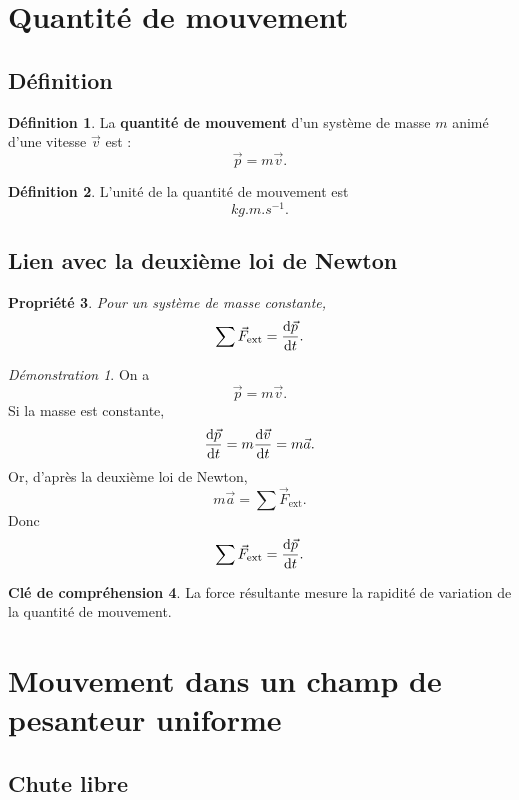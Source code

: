\documentclass[11pt,a4paper]{article}
\theoremstyle{definition}
\newtheorem{definition}{Définition}[section]
\newtheorem{interpretation}[definition]{Clé de compréhension}
\theoremstyle{plain}
\newtheorem{propriete}[definition]{Propriété}
\theoremstyle{remark}
\newtheorem*{demonstrationlibre}{Démonstration}
\begin{document}
\section{Quantité de mouvement}

\subsection{Définition}

\begin{definition}
La \textbf{quantité de mouvement} d'un système de masse $m$ animé d'une vitesse $\vec{v}$ est :
\[
\vec{p}=m\vec{v}.
\]
\end{definition}

\begin{definition}
L'unité de la quantité de mouvement est
\[
\si{kg.m.s^{-1}}.
\]
\end{definition}

\subsection{Lien avec la deuxième loi de Newton}

\begin{propriete}
Pour un système de masse constante,
\[
\sum \vec{F}_{\text{ext}}=\dv{\vec{p}}{t}.
\]
\end{propriete}

\begin{demonstrationlibre}
On a
\[
\vec{p}=m\vec{v}.
\]
Si la masse est constante,
\[
\dv{\vec{p}}{t}=m\dv{\vec{v}}{t}=m\vec{a}.
\]
Or, d'après la deuxième loi de Newton,
\[
m\vec{a}=\sum \vec{F}_{\text{ext}}.
\]
Donc
\[
\sum \vec{F}_{\text{ext}}=\dv{\vec{p}}{t}.
\]
\end{demonstrationlibre}

\begin{interpretation}
La force résultante mesure la rapidité de variation de la quantité de mouvement.
\end{interpretation}

\section{Mouvement dans un champ de pesanteur uniforme}

\subsection{Chute libre}
\end{document}

